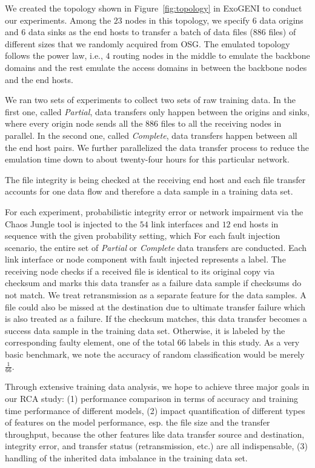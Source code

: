 We created the topology shown in Figure~\ref{fig:topology} in ExoGENI to conduct our experiments. Among the $23$ nodes in this topology, we specify $6$ data origins and $6$ data sinks as the end hosts 
to transfer a batch of data files ($886$ files) of different sizes that we randomly acquired from OSG. The emulated topology follows the power law, i.e., $4$ routing 
nodes in the middle to emulate the backbone domains and the rest emulate the access domains in between the backbone nodes and the end hosts. 

We ran two sets of experiments to collect two sets of raw training data. In the first one, called {\it Partial},
data transfers only happen between the origins and sinks, where every origin node sends all the $886$ files 
to all the receiving nodes in parallel. In the second one, called {\it Complete}, data transfers happen between all the end host pairs. 
We further parallelized the data transfer process to reduce the emulation time down to about twenty-four hours for this particular network.  

The file integrity is being checked at the receiving end host and each file transfer accounts for one data flow and therefore a
 data sample in a training data set.

For each experiment, probabilistic integrity error or network impairment via the Chaos Jungle tool is injected to the $54$ link interfaces and $12$ end hosts in sequence with the given probability setting, which 
For each fault injection scenario, the entire set of {\it Partial} or {\it Complete} data transfers are conducted. Each link interface or node component with fault injected represents a label.  
The receiving node checks if a received file is identical to its original copy via checksum and marks this data transfer as a failure data sample if checksums do not match. 
We treat retransmission as a separate feature for the data samples.  A file could also be missed at the destination due to ultimate transfer failure which is also treated as a failure. 
If the checksum matches, this data transfer becomes a success data sample in the training data set. Otherwise, it is labeled by the corresponding faulty element, one of the total $66$ labels in this study. 
As a very basic benchmark, we note the accuracy of random classification would be merely $\frac{1}{66}$. 

Through extensive training data analysis, we hope to achieve three major goals in our RCA study: (1) performance comparison in terms of accuracy and training time performance of different models, 
(2) impact quantification of different types of features on the model performance, esp. the file size and the transfer throughput, because the other features like data transfer source and destination, integrity error, 
and transfer status (retransmission, etc.) are all indispensable, (3) handling of the inherited data imbalance in the training data set.  

